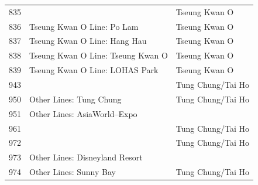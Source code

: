 \begin{longtable}{p{1.5cm}p{8cm}p{4cm}}
835 &  & Tseung Kwan O \\
836 & Tseung Kwan O Line: Po Lam & Tseung Kwan O \\
837 & Tseung Kwan O Line: Hang Hau & Tseung Kwan O \\
838 & Tseung Kwan O Line: Tseung Kwan O & Tseung Kwan O \\
839 & Tseung Kwan O Line: LOHAS Park & Tseung Kwan O \\
943 &  & Tung Chung/Tai Ho \\
950 & Other Lines: Tung Chung & Tung Chung/Tai Ho \\
951 & Other Lines: AsiaWorld–Expo &  \\
961 &  & Tung Chung/Tai Ho \\
972 &  & Tung Chung/Tai Ho \\
973 & Other Lines: Disneyland Resort &  \\
974 & Other Lines: Sunny Bay & Tung Chung/Tai Ho \\

\end{longtable}